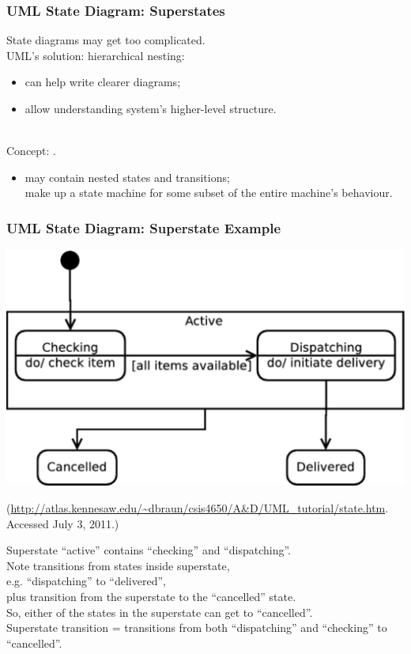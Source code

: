 \begin{frame}
\frametitle{UML State Diagram: Superstates}

\begin{changemargin}{1cm}

State diagrams may get too complicated.\\[1em]

UML's solution: hierarchical nesting:
\begin{itemize}
\item can help write clearer diagrams;
\item allow understanding system's higher-level structure.
\end{itemize}~\\

Concept: .

\begin{itemize}
\item  may contain nested states and transitions;\\
 make up a state machine for some subset of the entire machine's behaviour.
\end{itemize}

\end{changemargin}
\end{frame}

\begin{frame}
\frametitle{UML State Diagram: Superstate Example}

\begin{center}
\includegraphics[width=.5\textwidth]{images/statediagram2.pdf}

\scriptsize (\tiny\url{http://atlas.kennesaw.edu/~dbraun/csis4650/A&D/UML_tutorial/state.htm}. Accessed July 3, 2011.)
\end{center}

\begin{changemargin}{1cm}
Superstate ``active'' contains ``checking'' and ``dispatching''.\\[0.5em]

Note transitions from states inside
superstate,\\
 e.g. ``dispatching'' to ``delivered'', \\ plus transition
from the superstate to the ``cancelled'' state. \\

So, either of the states in the superstate can get to ``cancelled''. \\[0.5em]

Superstate transition = transitions from both ``dispatching'' and ``checking''
to ``cancelled''.
\end{changemargin}
\end{frame}

